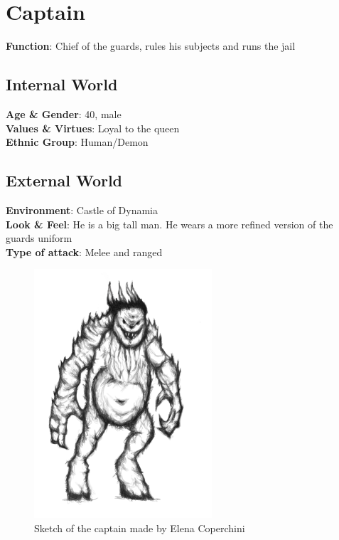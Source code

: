 \section{Captain}

\begin{minipage}{0.5\textwidth}
\textbf{Function}: Chief of the guards, rules his subjects and runs the jail

\subsection{Internal World}

\textbf{Age \& Gender}: 40, male \\
\textbf{Values \& Virtues}: Loyal to the queen\\
\textbf{Ethnic Group}: Human/Demon

\subsection{External World}
\textbf{Environment}: Castle of Dynamia \\
\textbf{Look \& Feel}: He is a big tall man. He wears a more refined version of the guards uniform \\
\textbf{Type of attack}: Melee and ranged \\
\end{minipage}%
%
\hfill\begin{minipage}{0.4\textwidth}
  \begin{figure}[H]
  \includegraphics{Images/Enemies/captain_portrait}
   \caption{Sketch of the captain made by Elena Coperchini}
  \end{figure}
\end{minipage}


